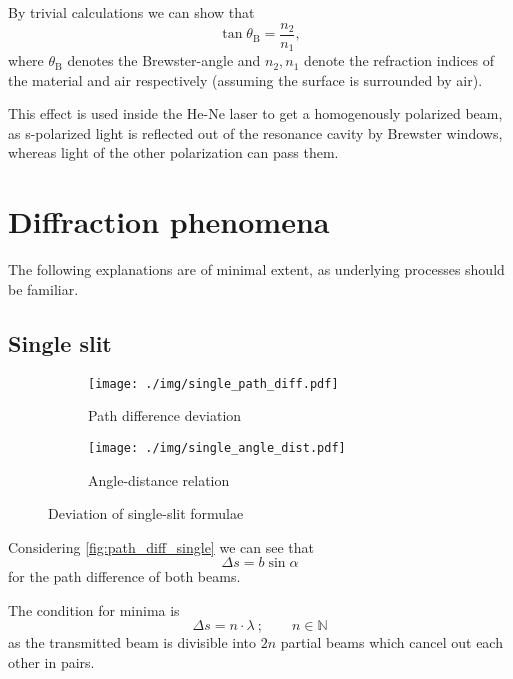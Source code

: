 By trivial calculations we can show that
\begin{equation}\label{eq:brewster}
	\tan\theta_\text{B}=\frac{n_2}{n_1},
\end{equation}
where $\theta_\text{B}$ denotes the Brewster-angle and $n_2, n_1$ denote the refraction indices of the material and air respectively (assuming the surface is surrounded by air).

This effect is used inside the He-Ne laser to get a homogenously polarized beam, as s-polarized light is reflected out of the resonance cavity by Brewster windows, whereas light of the other polarization can pass them.

\section{Diffraction phenomena}
The following explanations are of minimal extent, as underlying processes should be familiar.

\subsection{Single slit}\label{subsec:single_slit}

\begin{figure}[tb]
	\begin{subfigure}{.6\textwidth}
		\centering
		\texttt{[image: ./img/single\_path\_diff.pdf]}
		\caption[Single slit I]{Path difference deviation}
		\label{fig:path_diff_single}
	\end{subfigure}
	\begin{subfigure}{.5\textwidth}
		\centering
		\texttt{[image: ./img/single\_angle\_dist.pdf]}
		\caption[Single slit II]{Angle-distance relation}
		\label{fig:angle_distance_single}
	\end{subfigure}
	\caption[Deviation of single-slit formulae]{Deviation of single-slit formulae}
\end{figure}

Considering \autoref{fig:path_diff_single} we can see that	%
\begin{equation}\label{eq:path_diff}
	\Delta s=b\sin\alpha
\end{equation}
for the path difference of both beams.

The condition for minima is
\begin{equation}\label{eq:path_diff_min}
	\Delta s = n\cdot\lambda\ ;\qquad n\in\mathbb{N}
\end{equation}
as the transmitted beam is divisible into $2n$ partial beams which cancel out each other in pairs.

